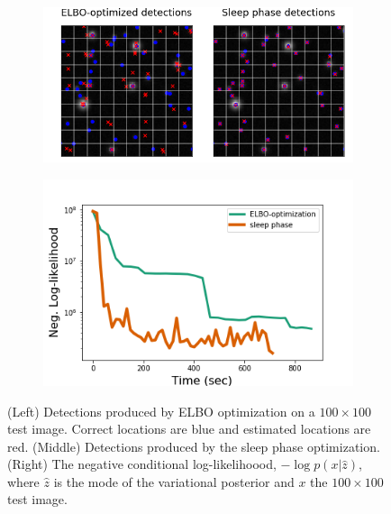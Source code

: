 \begin{figure}[!htb]
    \centering
    \begin{subfigure}[!t]{0.59\textwidth}
    \centering
    \includegraphics[width=\textwidth]{figures/optim_path_detect_compare_100x100.png}
    \end{subfigure}
    \begin{subfigure}[!t]{0.4\textwidth}
    \centering
    \includegraphics[width=\textwidth]{figures/optim_path_compare_100x100.png}
    \end{subfigure}
    \caption{
    (Left) Detections produced by ELBO optimization on a $100\times 100$ test image. Correct locations are blue and estimated locations are red. 
    (Middle) Detections produced by the sleep phase optimization.  
    (Right) The negative conditional log-likelihoood, $-\log p(x|\hat z)$, where $\hat z$ is the mode of the variational posterior and $x$ the 
    $100\times 100$ test image. }
    \label{fig:sim_data100x100}
\end{figure}
